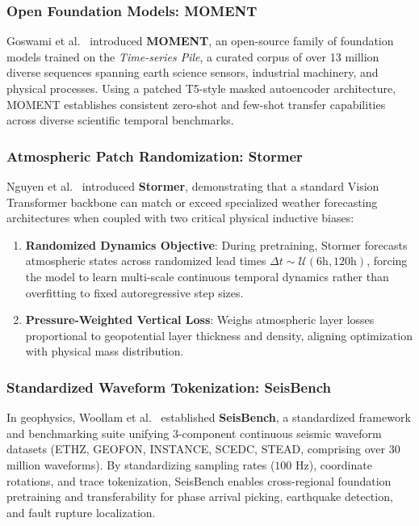 \subsubsection{Open Foundation Models: MOMENT}
Goswami et al.~\cite{goswami2024moment} introduced \textbf{MOMENT}, an open-source family of foundation models trained on the \textit{Time-series Pile}, a curated corpus of over 13 million diverse sequences spanning earth science sensors, industrial machinery, and physical processes. Using a patched T5-style masked autoencoder architecture, MOMENT establishes consistent zero-shot and few-shot transfer capabilities across diverse scientific temporal benchmarks.

\subsubsection{Atmospheric Patch Randomization: Stormer}
Nguyen et al.~\cite{nguyen2023stormer} introduced \textbf{Stormer}, demonstrating that a standard Vision Transformer backbone can match or exceed specialized weather forecasting architectures when coupled with two critical physical inductive biases:
\begin{enumerate}
    \item \textbf{Randomized Dynamics Objective}: During pretraining, Stormer forecasts atmospheric states across randomized lead times $\Delta t \sim \mathcal{U}(6\text{h}, 120\text{h})$, forcing the model to learn multi-scale continuous temporal dynamics rather than overfitting to fixed autoregressive step sizes.
    \item \textbf{Pressure-Weighted Vertical Loss}: Weighs atmospheric layer losses proportional to geopotential layer thickness and density, aligning optimization with physical mass distribution.
\end{enumerate}

\subsubsection{Standardized Waveform Tokenization: SeisBench}
In geophysics, Woollam et al.~\cite{woollam2022seisbench} established \textbf{SeisBench}, a standardized framework and benchmarking suite unifying 3-component continuous seismic waveform datasets (ETHZ, GEOFON, INSTANCE, SCEDC, STEAD, comprising over 30 million waveforms). By standardizing sampling rates ($100\text{ Hz}$), coordinate rotations, and trace tokenization, SeisBench enables cross-regional foundation pretraining and transferability for phase arrival picking, earthquake detection, and fault rupture localization.

